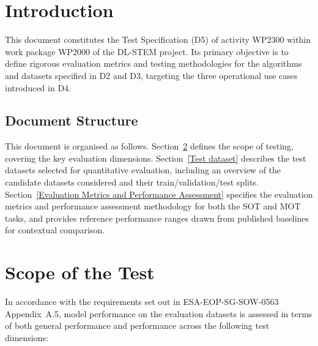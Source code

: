 \documentclass[11pt]{article}
\begin{document}
\newpage

\hypertarget{introduction}{%
\section{Introduction}\label{introduction}}

This document constitutes the Test Specification (D5) of activity WP2300 within work package WP2000 of the DL-STEM project. 
Its primary objective is to define rigorous evaluation metrics and testing methodologies for the algorithms and datasets specified 
in D2 and D3, targeting the three operational use cases introduced in D4.

\subsection{Document Structure}

This document is organised as follows. Section~\ref{Scope of the Test} defines 
the scope of testing, covering the key evaluation dimensions. 
Section~\ref{Test dataset} describes the test datasets selected for quantitative 
evaluation, including an overview of the candidate datasets considered and their 
train/validation/test splits. Section~\ref{Evaluation Metrics and Performance Assessment} 
specifies the evaluation metrics and performance assessment methodology for both 
the SOT and MOT tasks, and provides reference performance ranges drawn from 
published baselines for contextual comparison.

\hypertarget{Scope of the Test}{%
\section{Scope of the Test}\label{Scope of the Test}}

In accordance with the requirements set out in ESA-EOP-SG-SOW-0563 Appendix~A.5, 
model performance on the evaluation datasets is assessed in terms of both general 
performance and performance across the following test dimensions:
\end{document}
